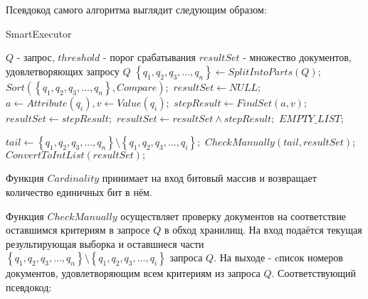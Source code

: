 \documentclass{matmex-diploma}
\begin{document}
        Псевдокод самого алгоритма выглядит следующим образом:
        \begin{algorithm}[H]                   
        \caption{SmartExecutor}              
        \label{smart}                        
            \begin{algorithmic}        
                \REQUIRE $Q$ - запрос, $threshold$ - порог срабатывания
                \ENSURE $resultSet$ - множество документов, удовлетворяющих запросу $Q$
                \STATE $\left\{ q_1, q_2, q_3, ... , q_n \right\} \leftarrow SplitIntoParts(Q);$
                \STATE $Sort(\left\{ q_1, q_2, q_3, ... , q_n \right\}, Compare);$
                \STATE $resultSet \leftarrow NULL;$
                    \STATE $a \leftarrow Attribute(q_i), v \leftarrow Value(q_i);$
                    \STATE $stepResult \leftarrow FindSet(a, v);$
                        \STATE $resultSet \leftarrow stepResult;$
                    \ELSE
                        \STATE $resultSet \leftarrow resultSet \land stepResult;$
                    \ENDIF
                        \RETURN $EMPTY\_LIST;$
                    \ENDIF
                    
                        \STATE $tail \leftarrow \left\{ q_1, q_2, q_3, ... , q_n \right\} \setminus \left\{ q_1, q_2, q_3, ... , q_i \right\};$
                        \RETURN $CheckManually(tail, resultSet);$
                    \ENDIF
                \ENDFOR
                \RETURN $ConvertToIntList(resultSet);$
            \end{algorithmic}
        \end{algorithm}
        
        Функция $Cardinality$ принимает на вход битовый массив и возвращает количество единичных бит в нём. 
    
        Функция $CheckManually$ осуществляет проверку документов на соответствие оставшимся критериям в запросе $Q$ в обход хранилищ. На вход подаётся текущая результирующая выборка и оставшиеся части $\left\{ q_1, q_2, q_3, ... , q_n \right\} \setminus \left\{ q_1, q_2, q_3, ... , q_i \right\}$ запроса $Q$. На выходе - cписок номеров документов, удовлетворяющим всем критериям из запроса $Q$. Соответствующий псевдокод:
        
\end{document}
